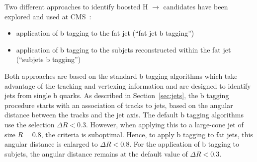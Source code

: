 Two different approaches to identify boosted H $\to$ \bbbar candidates have been explored
and used at CMS~\cite{CMS:BTV13001}:

\begin{itemize}
\item application of b tagging to the fat jet (``fat jet b tagging'')
\item application of b tagging to the subjets reconstructed within the fat jet (``subjets b tagging'')
\end{itemize}

Both approaches are based on the standard b tagging algorithms which take advantage of the tracking and vertexing information and are designed to identify jets from single b quarks.
As described in Section~\ref{sec:jets}, the b tagging procedure starts with an association of tracks to jets, based on the angular distance between the tracks and the jet axis. 
The default b tagging algorithms use the selection $\Delta R < 0.3$.  However, when applying this to a large-cone jet of size $R = 0.8$, 
the criteria is suboptimal. Hence, to apply b tagging to fat jets, this angular distance is enlarged to $\Delta R < 0.8$. 
For the application of b tagging to subjets, the angular distance remains at the default value of $\Delta R < 0.3$.\\

